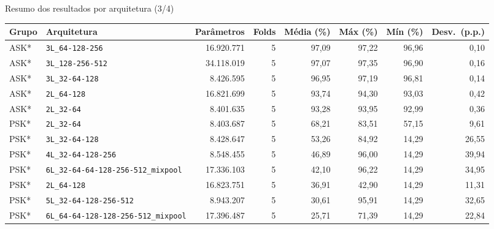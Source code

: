 \documentclass[aspectratio=169,11pt]{beamer}
\begin{document}
\begin{frame}{Resumo dos resultados por arquitetura (3/4)}
  \centering
  \small
  \begin{adjustbox}{max width=\textwidth}
  \begin{tabular}{llrrrrrr}
    \toprule
    Grupo & Arquitetura & Parâmetros & Folds & Média (\%) & Máx (\%) & Mín (\%) & Desv.\ (p.p.) \\
    \midrule
    ASK* & \texttt{3L\_64-128-256} & 16.920.771 & 5 & 97,09 & 97,22 & 96,96 & 0,10 \\
    ASK* & \texttt{3L\_128-256-512} & 34.118.019 & 5 & 97,07 & 97,35 & 96,90 & 0,16 \\
    ASK* & \texttt{3L\_32-64-128} & 8.426.595 & 5 & 96,95 & 97,19 & 96,81 & 0,14 \\
    ASK* & \texttt{2L\_64-128} & 16.821.699 & 5 & 93,74 & 94,30 & 93,03 & 0,42 \\
    ASK* & \texttt{2L\_32-64} & 8.401.635 & 5 & 93,28 & 93,95 & 92,99 & 0,36 \\
    PSK* & \texttt{2L\_32-64} & 8.403.687 & 5 & 68,21 & 83,51 & 57,15 & 9,61 \\
    PSK* & \texttt{3L\_32-64-128} & 8.428.647 & 5 & 53,26 & 84,92 & 14,29 & 26,55 \\
    PSK* & \texttt{4L\_32-64-128-256} & 8.548.455 & 5 & 46,89 & 96,00 & 14,29 & 39,94 \\
    PSK* & \texttt{6L\_32-64-64-128-256-512\_mixpool} & 17.336.103 & 5 & 42,10 & 96,22 & 14,29 & 34,95 \\
    PSK* & \texttt{2L\_64-128} & 16.823.751 & 5 & 36,91 & 42,90 & 14,29 & 11,31 \\
    PSK* & \texttt{5L\_32-64-128-256-512} & 8.943.207 & 5 & 30,61 & 95,91 & 14,29 & 32,65 \\
    PSK* & \texttt{6L\_64-64-128-128-256-512\_mixpool} & 17.396.487 & 5 & 25,71 & 71,39 & 14,29 & 22,84 \\
    \bottomrule
  \end{tabular}
  \end{adjustbox}
  \par\vspace{2mm}{\scriptsize * dados do relatório (backups locais); não disponíveis no Drive.}
\end{frame}
\end{document}
